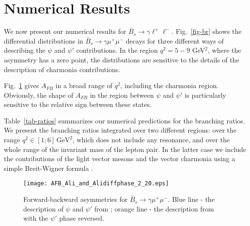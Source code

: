 \documentclass{PoS}
\begin{document}
\section{Numerical Results}
\label{sec-nresults}
We now present our numerical results for $\bar{B}_{s}\to \gamma \ell^+\ell^-$. Fig.~\ref{fig-br} shows the differential distributions in 
$\bar{B}_{s}\to \gamma\mu^+\mu^-$ decays for three different ways of describing the $\psi$ and $\psi'$ contributions. 
In the region $q^2=5-9$ GeV$^2$, where the asymmetry has a zero point, the distributions are sensitive to the details of the 
description of charmonia contributions. 




Fig.~\ref{fig-ratios} gives $A_{FB}$ in a broad range of $q^2$, including the charmonia region. Obviously, the shape of $A_{FB}$ 
in the region between  $\psi$ and $\psi'$ is particularly sensitive to the relative sign between these states. 

Table~\ref{tab-ratios} summarizes our numerical predictions for the branching ratios. We present the branching ratios integrated over 
two different regions: over the range $q^2\in[1;6]\,\mathrm{GeV^2}$, which does not include any resonance, and over the whole range of the 
invariant mass of the lepton pair. In the latter case we include the contributions of the light vector mesons and the 
vector charmonia using a simple Breit-Wigner formula \cite{ali}.  

\begin{figure}[h!]
\centering
\texttt{[image: AFB\_Ali\_and\_Alidiffphase\_2\_20.eps]}
\caption{Forward-backward asymmetries for $\bar{B}_{s}\to\gamma\mu^+\mu^-$. Blue line - the description of $\psi$ and $\psi'$ from \cite{ali}; 
orange line - the description from \cite{ali} with the $\psi'$ phase reversed.}
\label{fig-ratios}      
\end{figure}
\end{document}
